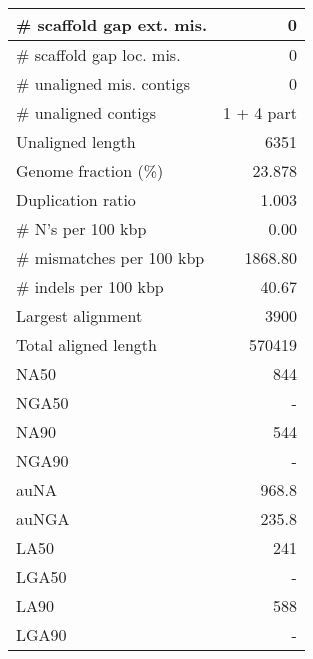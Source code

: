 \documentclass[12pt,a4paper]{article}
\begin{document}
\begin{table}[ht]
\begin{center}
\begin{tabular}{|l*{1}{|r}|}
\# scaffold gap ext. mis. & 0 \\ \hline
\# scaffold gap loc. mis. & 0 \\ \hline
\# unaligned mis. contigs & 0 \\ \hline
\# unaligned contigs & 1 + 4 part \\ \hline
Unaligned length & 6351 \\ \hline
Genome fraction (\%) & 23.878 \\ \hline
Duplication ratio & 1.003 \\ \hline
\# N's per 100 kbp & 0.00 \\ \hline
\# mismatches per 100 kbp & 1868.80 \\ \hline
\# indels per 100 kbp & 40.67 \\ \hline
Largest alignment & 3900 \\ \hline
Total aligned length & 570419 \\ \hline
NA50 & 844 \\ \hline
NGA50 & - \\ \hline
NA90 & 544 \\ \hline
NGA90 & - \\ \hline
auNA & 968.8 \\ \hline
auNGA & 235.8 \\ \hline
LA50 & 241 \\ \hline
LGA50 & - \\ \hline
LA90 & 588 \\ \hline
LGA90 & - \\ \hline
\end{tabular}
\end{center}
\end{table}
\end{document}
